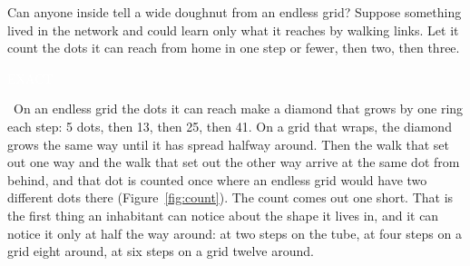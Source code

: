 \documentclass[11pt,letterpaper]{article}
\newcommand{\tagbox}[2]{{\sffamily\scriptsize\colorbox{#1}{\textcolor{white}{\strut #2}}}}
\newcommand{\Exact}{\tagbox{kExact}{EXACT}}
\begin{document}
Can anyone inside tell a wide doughnut from an endless grid? Suppose something lived in the network
and could learn only what it reaches by walking links. Let it count the dots it can reach from home in
one step or fewer, then two, then three. \Exact\ On an endless grid the dots it can reach make a
diamond that grows by one ring each step: 5 dots, then 13, then 25, then 41. On a grid that wraps, the
diamond grows the same way until it has spread halfway around. Then the walk that set out one way and
the walk that set out the other way arrive at the same dot from behind, and that dot is counted once
where an endless grid would have two different dots there (Figure~\ref{fig:count}). The count comes out
one short. That is the first thing an inhabitant can notice about the shape it lives in, and it can
notice it only at half the way around: at two steps on the tube, at four steps on a grid eight around,
at six steps on a grid twelve around.
\end{document}
